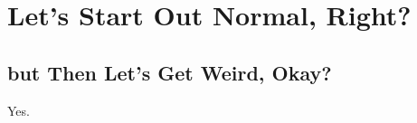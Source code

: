 \section{Let's Start Out Normal,
Right?}\label{lets-start-out-normal-right}

\subsection{but Then Let's Get Weird,
Okay?}\label{but-then-lets-get-weird-okay}

Yes.
